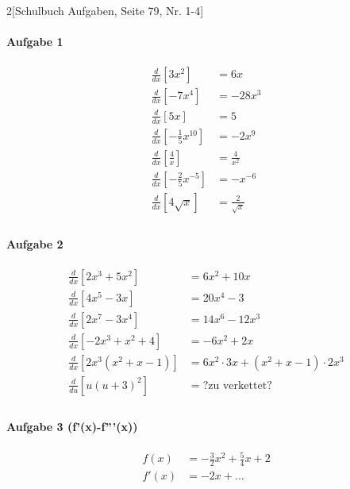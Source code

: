 \documentclass{report}
\begin{document}
\begin{multicols}{2}[Schulbuch Aufgaben, Seite 79, Nr. 1-4]
\paragraph{Aufgabe 1} %
\label{par:Aufgabe 1}
\begin{align*}
\frac{d}{dx}\left[3x^2\right]&=6x\\
\frac{d}{dx}\left[-7x^4\right]&=-28x^3\\
\frac{d}{dx}\left[5x\right]&=5\\
\frac{d}{dx}\left[-\frac{1}{5}x^{10}\right]&=-2x^9\\
\frac{d}{dx}\left[\frac{4}{x}\right]&=\frac{4}{x^2}\\
\frac{d}{dx}\left[-\frac{2}{5}x^{-5}\right]&=-x^{-6}\\
\frac{d}{dx}\left[4\sqrt{x}\right]&=\frac{2}{\sqrt{x}}\\
\end{align*}

\paragraph{Aufgabe 2} %
\label{par:Aufgabe 2}
\begin{align*}
\frac{d}{dx}\left[2x^3+5x^2\right]&=6x^2+10x\\
\frac{d}{dx}\left[4x^5-3x\right]&=20x^4-3\\
\frac{d}{dx}\left[2x^7-3x^4\right]&=14x^6-12x^3\\
\frac{d}{dx}\left[-2x^3+x^2+4\right]&=-6x^2+2x\\
\frac{d}{dx}\left[2x^3(x^2+x-1)\right]&=6x^2 \cdot 3x + (x^2+x-1) \cdot 2x^3\\
\frac{d}{du}\left[u(u+3)^2\right]&=?\text{zu verkettet}?\\
\end{align*}

\paragraph{Aufgabe 3 (f'(x)-f'''(x))} %
\label{par:Aufgabe 3}
\begin{align*}
f(x)&=-\frac{3}{2}x^2+\frac{5}{4}x+2\\
f'(x)&=-2x+...\\
\end{align*}


\end{multicols}
\end{document}
